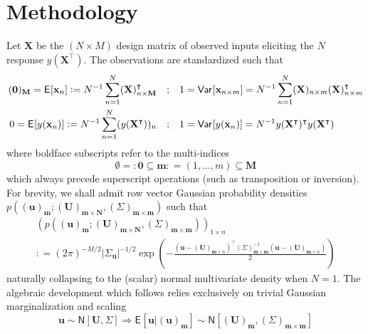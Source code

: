 \documentclass[preprint,12pt]{elsarticle}
\newcommand*{\M}[1]{\ensuremath{#1}\xspace}
\newcommand*{\vr}[1]{\M{\mathbf{#1}}}
\newcommand*{\deq}{\M{\mathrel{\mathop:}=}}
\newcommand*{\deqr}{\M{=\mathrel{\mathop:}}}
\newcommand{\T}[1]{\text{#1}}
\newcommand*{\QT}[2][]{\M{\quad\T{#2}\ifthenelse{\equal{#1}{}}{\quad}{#1}}}
\newcommand*{\ev}[2][]{\mathsf{E}_{#1}\!\left\lbrack{} #2 \right\rbrack}
\newcommand*{\var}[2][]{\mathsf{Var}_{#1}\!\left\lbrack{} #2 \right\rbrack}
\newcommand*{\gauss}[2]{\mathsf{N}\!\left\lbrack{} #1 , #2 \right\rbrack}
\newcommand*{\modulus}[1]{\M{\left\lvert#1\right\rvert}}
\begin{document}
    \section{Methodology} \label{sec:Method}
        Let $\vr{X}$ be the $(N \times M)$ design matrix of observed inputs eliciting the \M{N} response $y(\vr{X}^{\intercal})$. The observations are standardized such that
        \begin{align*}
            (\vr{0})_\vr{M} = \ev{\vr{x}_{n}} \deq N^{-1} \sum_{n=1}^{N} (\vr{X})_{n \times \vr{M}}^{\intercal} 
            &\QT{;} 1 = \var{\vr{x}_{n\times m}} = N^{-1}\sum_{n=1}^{N} (\vr{X})_{n \times m} (\vr{X})_{n \times m}^{\intercal}
            \\
            0 = \ev{y(\vr{x}_{n})} \deq N^{-1} \sum_{n=1}^{N} (y(\vr{X}^{\intercal}))_{n} 
            &\QT{;} 1 = \var{y(\vr{x}_{n})} = N^{-1} y(\vr{X}^{\intercal})^{\intercal}y(\vr{X}^{\intercal})
        \end{align*}
        where boldface subscripts refer to the multi-indices
        \begin{equation} \label{eq:Method:MultiIndexDef}
            \emptyset \deqr \vr{0} \subseteq\vr{m}\deq(1,\ldots,m) \subseteq \vr{M}
        \end{equation}
        which always precede superscript operations (such as transposition or inversion). For brevity, we shall admit row vector Gaussian probability densities $p\!\left((\vr{u})_{\vr{m}} ; (\vr{U})_{\vr{m}\times\vr{N}}, (\Sigma)_{\vr{m}\times\vr{m}}\right)$ such that
        \begin{multline} \label{eq:Method:pDef}
            \left(p\!\left((\vr{u})_{\vr{m}} ; (\vr{U})_{\vr{m}\times\vr{N}}, (\Sigma)_{\vr{m}\times\vr{m}}\right)\right)_{1 \times n} \\
            \deq (2 \pi)^{-M/2} \modulus{\Sigma_{\vr{u}}}^{-1/2} \exp\left(-\frac
            {(\vr{u}-(\vr{U})_{\vr{m}\times n})^{\intercal} (\Sigma)_{\vr{m}\times\vr{m}}^{-1} (\vr{u}-(\vr{U})_{\vr{m}\times n})}{2}
            \right)             
        \end{multline}
        naturally collapsing to the (scalar) normal multivariate density when $N=1$.
        The algebraic development which follows relies exclusively on trivial Gaussian marginalization and scaling
        \begin{equation} \label{eq:Method:marginalization}
            \vr{u} \sim \gauss{\vr{U}}{\Sigma} \Rightarrow
            \ev{\vr{u} \vert (\vr{u})_{\vr{m}}} \sim \gauss{(\vr{U})_{\vr{m}}}{(\Sigma)_{\vr{m}\times\vr{m}}}
        \end{equation}
\end{document}
